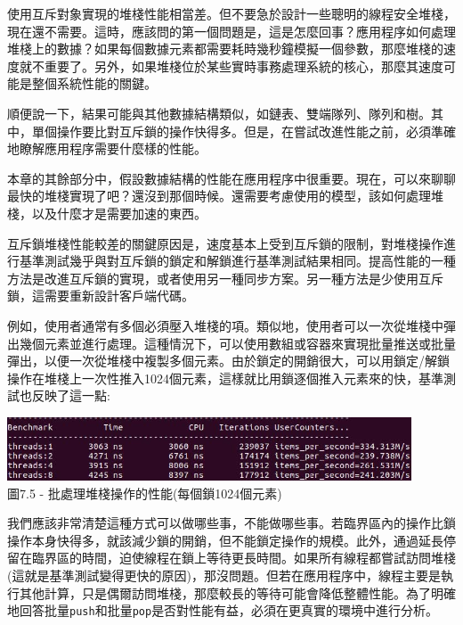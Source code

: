 使用互斥對象實現的堆棧性能相當差。但不要急於設計一些聰明的線程安全堆棧，現在還不需要。這時，應該問的第一個問題是，這是怎麼回事？應用程序如何處理堆棧上的數據？如果每個數據元素都需要耗時幾秒鐘模擬一個參數，那麼堆棧的速度就不重要了。另外，如果堆棧位於某些實時事務處理系統的核心，那麼其速度可能是整個系統性能的關鍵。

順便說一下，結果可能與其他數據結構類似，如鏈表、雙端隊列、隊列和樹。其中，單個操作要比對互斥鎖的操作快得多。但是，在嘗試改進性能之前，必須準確地瞭解應用程序需要什麼樣的性能。


本章的其餘部分中，假設數據結構的性能在應用程序中很重要。現在，可以來聊聊最快的堆棧實現了吧？還沒到那個時候。還需要考慮使用的模型，該如何處理堆棧，以及什麼才是需要加速的東西。

互斥鎖堆棧性能較差的關鍵原因是，速度基本上受到互斥鎖的限制，對堆棧操作進行基準測試幾乎與對互斥鎖的鎖定和解鎖進行基準測試結果相同。提高性能的一種方法是改進互斥鎖的實現，或者使用另一種同步方案。另一種方法是少使用互斥鎖，這需要重新設計客戶端代碼。

例如，使用者通常有多個必須壓入堆棧的項。類似地，使用者可以一次從堆棧中彈出幾個元素並進行處理。這種情況下，可以使用數組或容器來實現批量推送或批量彈出，以便一次從堆棧中複製多個元素。由於鎖定的開銷很大，可以用鎖定/解鎖操作在堆棧上一次性推入1024個元素，這樣就比用鎖逐個推入元素來的快，基準測試也反映了這一點:

\begin{center}
\includegraphics[width=0.9\textwidth]{content/2/chapter7/images/5.jpg}\\
圖7.5 - 批處理堆棧操作的性能(每個鎖1024個元素)
\end{center}

我們應該非常清楚這種方式可以做哪些事，不能做哪些事。若臨界區內的操作比鎖操作本身快得多，就該減少鎖的開銷，但不能鎖定操作的規模。此外，通過延長停留在臨界區的時間，迫使線程在鎖上等待更長時間。如果所有線程都嘗試訪問堆棧(這就是基準測試變得更快的原因)，那沒問題。但若在應用程序中，線程主要是執行其他計算，只是偶爾訪問堆棧，那麼較長的等待可能會降低整體性能。為了明確地回答批量\texttt{push}和批量\texttt{pop}是否對性能有益，必須在更真實的環境中進行分析。


